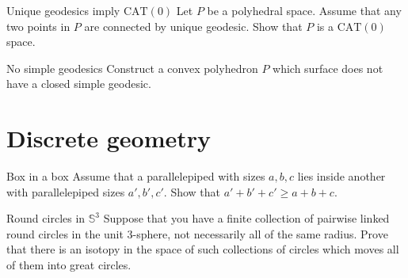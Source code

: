 \documentclass[twoside]{book}
\begin{document}
{\begin{pr}{\easy}{Unique geodesics imply $\mathrm{CAT}(0)$}\label{Unique geodesics imply CAT}
Let $P$ be a polyhedral space.
Assume that any two points in $P$ 
are connected by unique geodesic.
Show that $P$ is a $\mathrm{CAT}(0)$ space.
\end{pr}

\begin{pr}{\easy}{No simple geodesics}\label{No simple geodesics}
Construct a convex polyhedron $P$ which surface 
does not have a closed simple geodesic.
\end{pr}





\chapter{Discrete geometry}



\begin{pr}{}{Box in a box}\label{box-in-box} 
Assume that a parallelepiped with sizes $a,b,c$ 
lies inside another with parallelepiped sizes $a',b',c'$. 
Show that $a'+b'+c'\ge a+b+c$.
\end{pr}





\begin{pr}{\easy}{Round circles in $\mathbb{S}^3$}\label{Round circles}
Suppose that you have a finite collection of pairwise linked round circles in the unit 3-sphere, 
not necessarily all of the same radius. 
Prove that there is an isotopy in the space of such collections of circles 
which moves all of them into great circles.
\end{pr}

}
\end{document}
